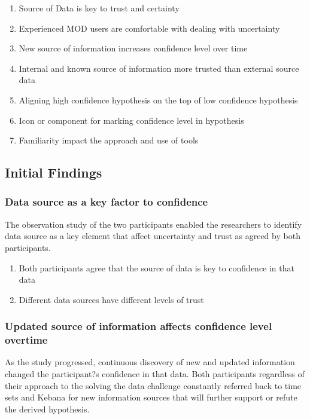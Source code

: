 \documentclass[journal]{vgtc}                %
\begin{document}
\begin{enumerate}
  \item Source of Data is key to trust and certainty
  \item Experienced MOD users are comfortable with dealing with uncertainty
  \item New source of information increases confidence level over time
  \item Internal and known source of information more trusted than external source data
  \item Aligning high confidence hypothesis on the top of low confidence hypothesis
  \item Icon or component for marking confidence level in hypothesis
  \item Familiarity impact the approach and use of tools
\end{enumerate}

\subsection{Initial Findings}
\subsubsection{Data source as a key factor to confidence}
The observation study of the two participants enabled the researchers to identify data source as a key element that affect uncertainty and trust as agreed by both participants. 
\begin{enumerate}
  \item Both participants agree that the source of data is key to confidence in that data
  \item Different data sources have different levels of trust 
\end{enumerate}

\subsubsection{Updated source of information affects confidence level overtime}
As the study progressed, continuous discovery of new and updated information changed the participant?s confidence in that data. Both participants regardless of their approach to the solving the data challenge constantly referred back to time sets and Kebana for new information sources that will further support or refute the derived hypothesis.
\end{document}
